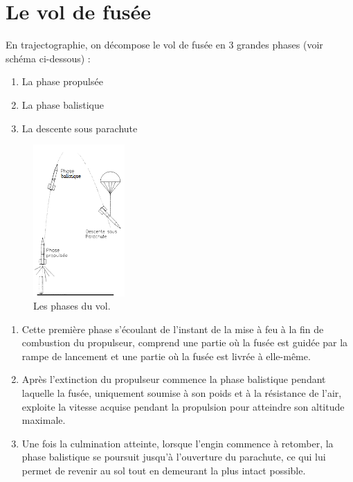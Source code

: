\documentclass[a4paper]{article}
\begin{document}
\section{Le vol de fusée}

En trajectographie, on décompose le vol de fusée en 3 grandes phases (voir schéma ci-dessous) : 

\begin{enumerate}
\item La phase propulsée
\item La phase balistique
\item La descente sous parachute
\end{enumerate}

\begin{figure}[!htbp]
\begin{center}
\includegraphics[width=3.5cm]{pictures/phases_vol.PNG} 
\end{center}
\caption{Les phases du vol.}
\end{figure}


\begin{enumerate}
\item Cette première phase s'écoulant  de  l'instant  de  la  mise à  feu à  la  fin  de  combustion  du  propulseur, comprend  une  partie  où  la  fusée  est  
guidée par la rampe de lancement et une partie où la fusée est livrée à elle-même. 
\item Après l'extinction du propulseur commence la  phase  balistique
  pendant  laquelle  la  fusée,  
uniquement soumise à son poids et à la résistance 
de l'air, exploite la vitesse acquise pendant la propulsion pour atteindre son altitude maximale. 
\item Une fois la culmination atteinte, lorsque l'engin commence à retomber, la phase balistique se 
poursuit  jusqu'à l'ouverture  du  parachute,  ce  qui  lui  permet  
de  revenir  au  sol  tout  en  
demeurant la plus intact possible. \\  
\end{enumerate} 
\end{document}
